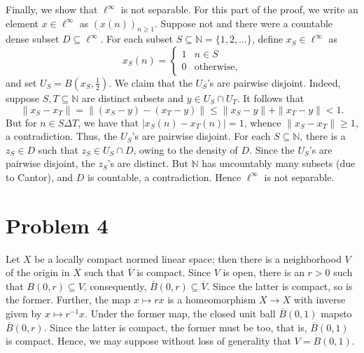 \documentclass[10pt]{amsart}
\theoremstyle{thmstyle}
\theoremstyle{defstyle}
\newcommand{\N}{\mathbb{N}}
\renewcommand{\le}{\leqslant}
\renewcommand{\ge}{\geqslant}
\begin{document}
Finally, we show that $\ell^\infty$ is not separable. For this part of the proof, we write an element $x\in \ell^\infty$ as $(x(n))_{n\ge 1}$. Suppose not and there were a countable dense subset $D\subseteq\ell^\infty$. For each subset $S\subseteq\N = \{1,2,\dots\}$, define $x_S\in\ell^\infty$ as 
\begin{equation*}
	x_S(n) = 
	\begin{cases}
		1 & n\in S\\
		0 & \text{otherwise},
	\end{cases}
\end{equation*}
and set $U_S = B\left(x_S, \frac{1}{2}\right)$. We claim that the $U_S$'s are pairwise disjoint. Indeed, suppose $S, T\subseteq\N$ are distinct subsets and $y\in U_S\cap U_T$. It follows that 
\begin{equation*}
	\|x_S - x_T\| = \|(x_S - y) - (x_T - y)\|\le \|x_S - y\| + \|x_T - y\| < 1.
\end{equation*}
But for $n\in S\Delta T$, we have that $|x_S(n) - x_T(n)| = 1$, whence $\|x_S - x_T\|\ge 1$, a contradiction. Thus, the $U_S$'s are pairwise disjoint. For each $S\subseteq\N$, there is a $z_S\in D$ such that $z_S\in U_S\cap D$, owing to the density of $D$. Since the $U_S$'s are pairwise disjoint, the $z_S$'s are distinct. But $\N$ has uncountably many subsets (due to Cantor), and $D$ is countable, a contradiction. Hence $\ell^\infty$ is not separable.


\section{Problem 4}

Let $X$ be a locally compact normed linear space; then there is a neighborhood $V$ of the origin in $X$ such that $\overline V$ is compact. Since $V$ is open, there is an $r > 0$ such that $B(0, r)\subseteq V$, consequently, $\overline B(0, r)\subseteq\overline V$. Since the latter is compact, so is the former. Further, the map $x\mapsto r x$ is a homeomorphism $X\to X$ with inverse given by $x\mapsto r^{-1}x$. Under the former map, the closed unit ball $\overline B(0, 1)$ mapsto $\overline B(0, r)$. Since the latter is compact, the former must be too, that is, $\overline B(0, 1)$ is compact. Hence, we may suppose without loss of generality that $V = B(0, 1)$.
\end{document}
